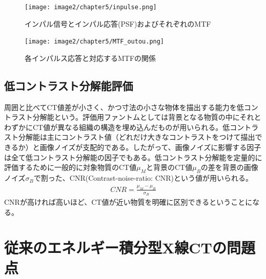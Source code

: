 \begin{figure}[H]
 \begin{center}
 \texttt{[image: image2/chapter5/inpulse.png]} 
 \end{center}
 \caption{インパル信号とインパル応答(PSF)およびそれぞれのMTF}
 \label{fig:inpulse}
\end{figure}

\begin{figure}[H]
 \begin{center}
 \texttt{[image: image2/chapter5/MTF\_outou.png]} 
 \end{center}
 \caption{各インパルス応答と対応するMTFの関係}
 \label{fig:MTF_outou}
\end{figure}



\subsection{低コントラスト分解能評価}
周囲と比べてCT値差が小さく、かつ寸法の小さな物体を描出する能力を低コントラスト分解能という。評価用ファントムとしては背景となる物質の中にそれとわずかにCT値が異なる組織の構造を埋め込んだものが用いられる。低コントラスト分解能は主にコントラスト値（どれだけ大きなコントラストをつけて描出できるか）と画像ノイズが支配的である。したがって、画像ノイズに影響する因子は全て低コントラスト分解能の因子でもある。低コントラスト分解能を定量的に評価するために一般的に対象物質のCT値$\mu_M$と背景のCT値$\mu_B$の差を背景の画像ノイズ$\sigma_B$で割った、CNR(Contrast-noise-ratio: CNR)という値が用いられる。
\begin{align}
CNR = \frac{\mu_M-\mu_B}{\sigma_B}
\end{align}
CNRが高ければ高いほど、CT値が近い物質を明確に区別できるということになる。

\section{従来のエネルギー積分型X線CTの問題点\label{sec:problem}}

